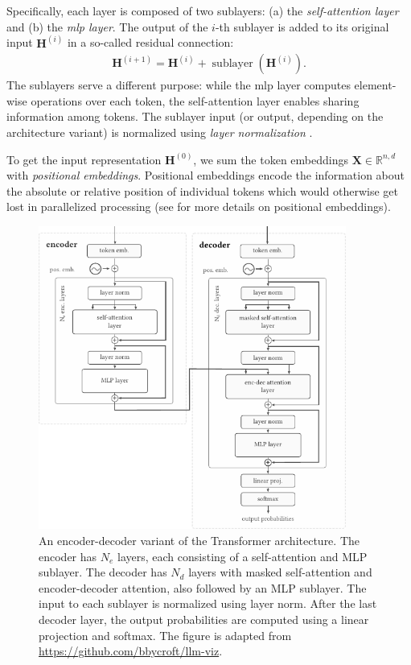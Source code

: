 {Specifically, each layer is composed of two sublayers: (a) the \emph{self-attention layer} and (b) the \emph{\ac{mlp} layer}. The output of the $i$-th sublayer is added to its original input $\mathbf{H}^{(i)}$ in a so-called residual connection:
\begin{align}
  \mathbf{H}^{(i+1)} = \mathbf{H}^{(i)} + \operatorname{sublayer}(\mathbf{H}^{(i)}).
\end{align}
The sublayers serve a different purpose: while the \ac{mlp} layer computes element-wise operations over each token, the self-attention layer enables sharing information among tokens. The sublayer input (or output, depending on the architecture variant) is normalized using \emph{layer normalization} \cite{ba2016layer}.

To get the input representation $\mathbf{H}^{(0)}$, we sum the token embeddings $\mathbf{X} \in \mathbb{R}^{n,d}$ with \emph{positional embeddings}. Positional embeddings encode the information about the absolute or relative position of individual tokens which would otherwise get lost in parallelized processing (see \citet{dufter2022position} for more details on positional embeddings).


\begin{figure}[ht]
  \centering
  \includegraphics[width=0.9\textwidth]{img/transformer.pdf}
  \caption{An encoder-decoder variant of the Transformer architecture. The encoder has $N_{e}$ layers, each consisting of a self-attention and MLP sublayer. The decoder has $N_{d}$ layers with masked self-attention and encoder-decoder attention, also followed by an MLP sublayer. The input to each sublayer is normalized using layer norm. After the last decoder layer, the output probabilities are computed using a linear projection and softmax. The figure is adapted from \href{https://github.com/bbycroft/llm-viz/blob/main/src/llm/intro-image.svg}{https://github.com/bbycroft/llm-viz}.}
  \label{fig:transformer}
\end{figure}


}
